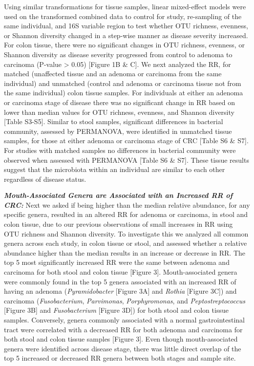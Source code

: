 \documentclass[12pt,]{article}
\begin{document}
Using similar transformations for tissue samples, linear mixed-effect
models were used on the transformed combined data to control for study,
re-sampling of the same individual, and 16S variable region to test
whether OTU richness, evenness, or Shannon diversity changed in a
step-wise manner as disease severity increased. For colon tissue, there
were no significant changes in OTU richness, evenness, or Shannon
diversity as disease severity progressed from control to adenoma to
carcinoma (P-value \textgreater{} 0.05) {[}Figure 1B \& C{]}. We next
analyzed the RR, for matched (unaffected tissue and an adenoma or
carcinoma from the same individual) and unmatched (control and adenoma
or carcinoma tissue not from the same individual) colon tissue samples.
For individuals at either an adenoma or carcinoma stage of disease there
was no significant change in RR based on lower than median values for
OTU richness, evenness, and Shannon diversity {[}Table S3-S5{]}. Similar
to stool samples, significant differences in bacterial community,
assessed by PERMANOVA, were identified in unmatched tissue samples, for
those at either adenoma or carcinoma stage of CRC {[}Table S6 \& S7{]}.
For studies with matched samples no differences in bacterial community
were observed when assessed with PERMANOVA {[}Table S6 \& S7{]}. These
tissue results suggest that the microbiota within an individual are
similar to each other regardless of disease status.

\textbf{\emph{Mouth-Associated Genera are Associated with an Increased
RR of CRC:}} Next we asked if being higher than the median relative
abundance, for any specific genera, resulted in an altered RR for
adenoma or carcinoma, in stool and colon tissue, due to our previous
observations of small increases in RR using OTU richness and Shannon
diversity. To investigate this we analyzed all common genera across each
study, in colon tissue or stool, and assessed whether a relative
abundance higher than the median results in an increase or decrease in
RR. The top 5 most significantly increased RR were the same between
adenoma and carcinoma for both stool and colon tissue {[}Figure 3{]}.
Mouth-associated genera were commonly found in the top 5 genera
associated with an increased RR of having an adenoma
(\emph{Pyramidobacter} {[}Figure 3A{]} and \emph{Rothia} {[}Figure
3C{]}) and carcinoma (\emph{Fusobacterium}, \emph{Parvimonas},
\emph{Porphyromonas}, and \emph{Peptostreptococcus} {[}Figure 3B{]} and
\emph{Fusobacterium} {[}Figure 3D{]}) for both stool and colon tissue
samples. Conversely, genera commonly associated with a normal
gastrointestinal tract were correlated with a decreased RR for both
adenoma and carcinoma for both stool and colon tissue samples {[}Figure
3{]}. Even though mouth-associated genera were identified across disease
stage, there was little direct overlap of the top 5 increased or
decreased RR genera between both stages and sample site.
\end{document}
